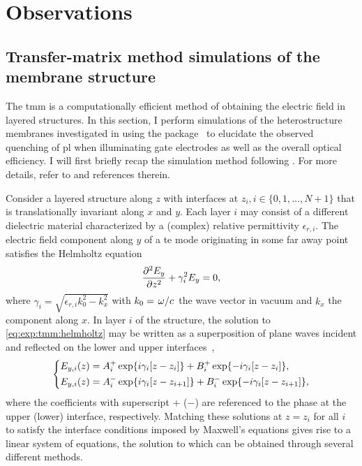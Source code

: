 \chapter{Observations}\label{ch:exp:observations}
\section{Transfer-matrix method simulations of the membrane structure}\label{sec:exp:tmm}
The \gls{tmm} is a computationally efficient method of obtaining the electric field in layered structures.
In this section, I perform simulations of the heterostructure membranes investigated in \thispart using the \pymoosh package~\cite{Langevin2024} to elucidate the observed quenching of \gls{pl} when illuminating gate electrodes as well as the overall optical efficiency.
I will first briefly recap the simulation method following .
For more details, refer to \ibid and references therein.

Consider a layered structure along $z$ with interfaces at $z_i, i\in\lbrace 0, 1, \dotsc, N+1\rbrace$ that is translationally invariant along $x$ and $y$.
Each layer $i$ may consist of a different dielectric material characterized by a (complex) relative permittivity $\epsilon_{r,i}$.
The electric field component along $y$ of a \gls{te} mode originating in some far away point satisfies the Helmholtz equation
\begin{equation}\label{eq:exp:tmm:helmholtz}
    \pdv[2]{E_y}{z} + \gamma_i^2 E_y = 0,
\end{equation}
where $\gamma_i = \sqrt{\epsilon_{r,i}k_0^2 - k_x^2}$ with $k_0=\flatfrac{\omega}{c}$ the wave vector in vacuum and $k_x$ the component along $x$.
In layer $i$ of the structure, the solution to \cref{eq:exp:tmm:helmholtz} may be written as a superposition of plane waves incident and reflected on the lower and upper interfaces~\cite{Langevin2024},
\begin{equation}\label{eq:exp:tmm:fields}
    \begin{dcases}
        E_{y,i}(z) = A_i^{+}\exp{\ensuremath{i}\gamma_i[z-z_{i}]} + B_i^{+}\exp{-\ensuremath{i}\gamma_i[z-z_{i}]}, \\
        E_{y,i}(z) = A_i^{-}\exp{\ensuremath{i}\gamma_i[z-z_{i+1}]} + B_i^{-}\exp{-\ensuremath{i}\gamma_i[z-z_{i+1}]},
    \end{dcases}
\end{equation}
where the coefficients with superscript $+$ ($-$) are referenced to the phase at the upper (lower) interface, respectively.
Matching these solutions at $z=z_i$ for all $i$ to satisfy the interface conditions imposed by Maxwell's equations gives rise to a linear system of equations, the solution to which can be obtained through several different methods.

